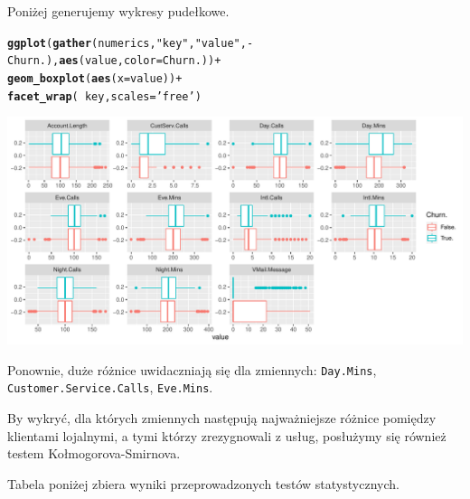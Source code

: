 \documentclass{article}\usepackage[]{graphicx}\usepackage[]{color}
\makeatletter
\def\maxwidth{ %
  \ifdim\Gin@nat@width>\linewidth
    \linewidth
  \else
    \Gin@nat@width
  \fi
}
\newcommand{\hlstr}[1]{\textcolor[rgb]{0.192,0.494,0.8}{#1}}%
\newcommand{\hlopt}[1]{\textcolor[rgb]{0,0,0}{#1}}%
\newcommand{\hlstd}[1]{\textcolor[rgb]{0.345,0.345,0.345}{#1}}%
\newcommand{\hlkwc}[1]{\textcolor[rgb]{0.333,0.667,0.333}{#1}}%
\newcommand{\hlkwd}[1]{\textcolor[rgb]{0.737,0.353,0.396}{\textbf{#1}}}%
\newenvironment{kframe}{%
 \def\at@end@of@kframe{}%
 \ifinner\ifhmode%
  \def\at@end@of@kframe{\end{minipage}}%
  \begin{minipage}{\columnwidth}%
 \fi\fi%
 \def\FrameCommand##1{\hskip\@totalleftmargin \hskip-\fboxsep
 \colorbox{shadecolor}{##1}\hskip-\fboxsep
     \hskip-\linewidth \hskip-\@totalleftmargin \hskip\columnwidth}%
 \MakeFramed {\advance\hsize-\width
   \@totalleftmargin\z@ \linewidth\hsize
   \@setminipage}}%
 {\par\unskip\endMakeFramed%
 \at@end@of@kframe}
\newenvironment{knitrout}{}{} %
\makeatother
\begin{document}
Poniżej generujemy wykresy pudełkowe. 
\begin{knitrout}
\color{fgcolor}\begin{kframe}
\begin{alltt}
\hlkwd{ggplot}\hlstd{(}\hlkwd{gather}\hlstd{(numerics,} \hlstr{"key"}\hlstd{,} \hlstr{"value"}\hlstd{,} \hlopt{-}\hlstd{Churn.),} \hlkwd{aes}\hlstd{(value,} \hlkwc{color}\hlstd{=Churn.))} \hlopt{+}
  \hlkwd{geom_boxplot}\hlstd{(}\hlkwd{aes}\hlstd{(}\hlkwc{x}\hlstd{=value))} \hlopt{+}
  \hlkwd{facet_wrap}\hlstd{(}\hlopt{~}\hlstd{key,} \hlkwc{scales}\hlstd{=}\hlstr{'free'}\hlstd{)}
\end{alltt}
\end{kframe}

{\centering \includegraphics[width=\maxwidth]{figure/Wykresy_pudelkowe-1} 

}



\end{knitrout}
Ponownie, duże różnice uwidaczniają się dla zmiennych: \verb|Day.Mins|, \verb|Customer.Service.Calls|, \verb|Eve.Mins|.

By wykryć, dla których zmiennych następują najważniejsze różnice pomiędzy klientami lojalnymi, a tymi którzy zrezygnowali z usług, posłużymy się również testem Kołmogorova-Smirnova.


Tabela poniżej zbiera wyniki przeprowadzonych testów statystycznych.
\begin{table}[!h]

\caption{\label{tab:Tabela z testami statystycznymi}Wyniki testu Kolmogorova-Smirnova}
\centering
{}
\end{table}
\end{document}
